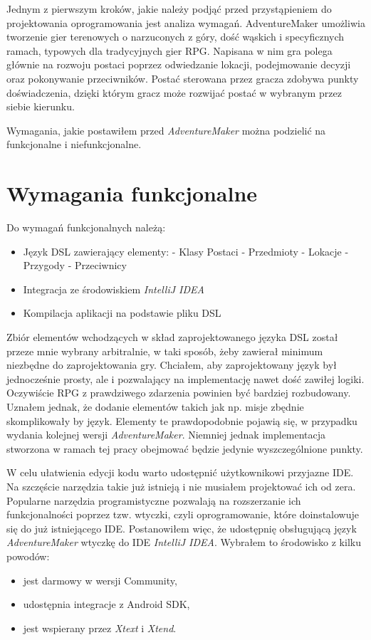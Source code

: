 \documentclass[openright]{xmgr}
\begin{document}
Jednym z pierwszym kroków, jakie należy podjąć przed przystąpieniem do projektowania oprogramowania jest analiza wymagań. AdventureMaker umożliwia tworzenie gier terenowych o narzuconych z góry, dość wąskich i specyficznych ramach, typowych dla tradycyjnych gier RPG. Napisana w nim gra polega głównie na rozwoju postaci poprzez odwiedzanie lokacji, podejmowanie decyzji oraz pokonywanie przeciwników. Postać sterowana przez gracza zdobywa punkty doświadczenia, dzięki którym gracz może rozwijać postać w wybranym przez siebie kierunku. 

Wymagania, jakie postawiłem przed \textit{AdventureMaker} można podzielić na funkcjonalne i niefunkcjonalne.

\section{Wymagania funkcjonalne}
Do wymagań funkcjonalnych należą:
\begin{itemize}
\item Język DSL zawierający elementy:
\subitem - Klasy Postaci
\subitem - Przedmioty
\subitem - Lokacje
\subitem - Przygody
\subitem - Przeciwnicy
\item Integracja ze środowiskiem \textit{IntelliJ IDEA}
\item Kompilacja aplikacji na podstawie pliku DSL 
\end{itemize}

Zbiór elementów wchodzących w skład zaprojektowanego języka DSL został przeze mnie wybrany arbitralnie, w taki sposób, żeby zawierał minimum niezbędne do zaprojektowania gry. Chciałem, aby zaprojektowany język był jednocześnie prosty, ale i pozwalający na implementację nawet dość zawiłej logiki. Oczywiście RPG z prawdziwego zdarzenia powinien być bardziej rozbudowany. Uznałem jednak, że dodanie elementów takich jak np. misje zbędnie skomplikowały by język. Elementy te prawdopodobnie pojawią się, w przypadku wydania kolejnej wersji \textit{AdventureMaker}. Niemniej jednak implementacja stworzona w ramach tej pracy obejmować będzie jedynie wyszczególnione punkty.

W celu ułatwienia edycji kodu warto udostępnić użytkownikowi przyjazne IDE. Na szczęście narzędzia takie już istnieją i nie musiałem projektować ich od zera. Popularne narzędzia programistyczne pozwalają na rozszerzanie ich funkcjonalności poprzez tzw. wtyczki, czyli oprogramowanie, które doinstalowuje się do już istniejącego IDE. Postanowiłem więc, że udostępnię obsługującą język \textit{AdventureMaker} wtyczkę do IDE \textit{IntelliJ IDEA}. Wybrałem to środowisko z kilku powodów:
\begin{itemize}	
\item jest darmowy w wersji Community,
\item udostępnia integracje z Android SDK,
\item jest wspierany przez \textit{Xtext} i \textit{Xtend}.
\end{itemize}
\end{document}

